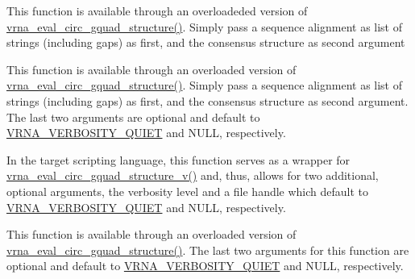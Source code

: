 \begin{DoxyRefList}
\item[\label{wrappers__wrappers000048}%
\Hypertarget{wrappers__wrappers000048}%
Global \hyperlink{group__eval_gac673ebb9ae2a29f54d201e2ac5b85540}{vrna\+\_\+eval\+\_\+circ\+\_\+gquad\+\_\+consensus\+\_\+structure} (const char $\ast$$\ast$alignment, const char $\ast$structure)]This function is available through an overloadeded version of \hyperlink{group__eval_ga9dba2fc5d7e6ad1359a7c2f350589c0e}{vrna\+\_\+eval\+\_\+circ\+\_\+gquad\+\_\+structure()}. Simply pass a sequence alignment as list of strings (including gaps) as first, and the consensus structure as second argument  
\item[\label{wrappers__wrappers000058}%
\Hypertarget{wrappers__wrappers000058}%
Global \hyperlink{group__eval_gaecd3e17292a0b3927277434019a5e187}{vrna\+\_\+eval\+\_\+circ\+\_\+gquad\+\_\+consensus\+\_\+structure\+\_\+v} (const char $\ast$$\ast$alignment, const char $\ast$structure, int verbosity\+\_\+level, F\+I\+LE $\ast$file)]This function is available through an overloaded version of \hyperlink{group__eval_ga9dba2fc5d7e6ad1359a7c2f350589c0e}{vrna\+\_\+eval\+\_\+circ\+\_\+gquad\+\_\+structure()}. Simply pass a sequence alignment as list of strings (including gaps) as first, and the consensus structure as second argument. The last two arguments are optional and default to \hyperlink{group__eval_gaf4afe19780b61b4962c613bde324128b}{V\+R\+N\+A\+\_\+\+V\+E\+R\+B\+O\+S\+I\+T\+Y\+\_\+\+Q\+U\+I\+ET} and N\+U\+LL, respectively.  
\item[\label{wrappers__wrappers000044}%
\Hypertarget{wrappers__wrappers000044}%
Global \hyperlink{group__eval_ga9dba2fc5d7e6ad1359a7c2f350589c0e}{vrna\+\_\+eval\+\_\+circ\+\_\+gquad\+\_\+structure} (const char $\ast$string, const char $\ast$structure)]In the target scripting language, this function serves as a wrapper for \hyperlink{group__eval_gab96a6c59923ff06c35f8c2fd2c239727}{vrna\+\_\+eval\+\_\+circ\+\_\+gquad\+\_\+structure\+\_\+v()} and, thus, allows for two additional, optional arguments, the verbosity level and a file handle which default to \hyperlink{group__eval_gaf4afe19780b61b4962c613bde324128b}{V\+R\+N\+A\+\_\+\+V\+E\+R\+B\+O\+S\+I\+T\+Y\+\_\+\+Q\+U\+I\+ET} and N\+U\+LL, respectively.  
\item[\label{wrappers__wrappers000054}%
\Hypertarget{wrappers__wrappers000054}%
Global \hyperlink{group__eval_gab96a6c59923ff06c35f8c2fd2c239727}{vrna\+\_\+eval\+\_\+circ\+\_\+gquad\+\_\+structure\+\_\+v} (const char $\ast$string, const char $\ast$structure, int verbosity\+\_\+level, F\+I\+LE $\ast$file)]This function is available through an overloaded version of \hyperlink{group__eval_ga9dba2fc5d7e6ad1359a7c2f350589c0e}{vrna\+\_\+eval\+\_\+circ\+\_\+gquad\+\_\+structure()}. The last two arguments for this function are optional and default to \hyperlink{group__eval_gaf4afe19780b61b4962c613bde324128b}{V\+R\+N\+A\+\_\+\+V\+E\+R\+B\+O\+S\+I\+T\+Y\+\_\+\+Q\+U\+I\+ET} and N\+U\+LL, respectively.  

\end{DoxyRefList}
